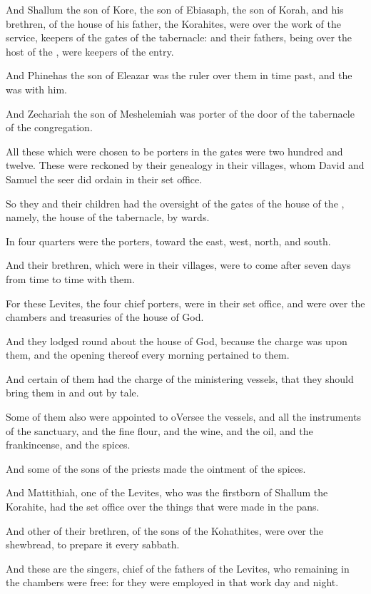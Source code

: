 \Verse And Shallum the son of Kore, the son of Ebiasaph, the son of Korah, and his brethren, of the house of his father, the Korahites, were over the work of the service, keepers of the gates of the tabernacle: and their fathers, being over the host of the \LORD, were keepers of the entry.

\Verse And Phinehas the son of Eleazar was the ruler over them in time past, and the \LORD was with him.

\Verse And Zechariah the son of Meshelemiah was porter of the door of the tabernacle of the congregation.

\Verse All these which were chosen to be porters in the gates were two hundred and twelve. These were reckoned by their genealogy in their villages, whom David and Samuel the seer did ordain in their set office.

\Verse So they and their children had the oversight of the gates of the house of the \LORD, namely, the house of the tabernacle, by wards.

\Verse In four quarters were the porters, toward the east, west, north, and south.

\Verse And their brethren, which were in their villages, were to come after seven days from time to time with them.

\Verse For these Levites, the four chief porters, were in their set office, and were over the chambers and treasuries of the house of God.

\Verse And they lodged round about the house of God, because the charge was upon them, and the opening thereof every morning pertained to them.

\Verse And certain of them had the charge of the ministering vessels, that they should bring them in and out by tale.

\Verse Some of them also were appointed to oVersee the vessels, and all the instruments of the sanctuary, and the fine flour, and the wine, and the oil, and the frankincense, and the spices.

\Verse And some of the sons of the priests made the ointment of the spices.

\Verse And Mattithiah, one of the Levites, who was the firstborn of Shallum the Korahite, had the set office over the things that were made in the pans.

\Verse And other of their brethren, of the sons of the Kohathites, were over the shewbread, to prepare it every sabbath.

\Verse And these are the singers, chief of the fathers of the Levites, who remaining in the chambers were free: for they were employed in that work day and night.

